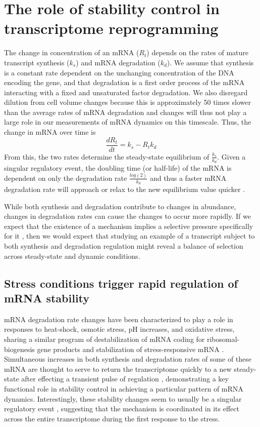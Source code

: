 \section{The role of stability control in transcriptome
reprogramming}

The change in concentration of an mRNA ($R_t$) depends
on the rates of mature transcript synthesis ($k_s$) and mRNA
degradation ($k_d$). We assume that
synthesis is a constant rate dependent on the unchanging concentration
of the DNA encoding the gene, and that degradation is a first
order process of the mRNA interacting with a fixed and unsaturated
factor degradation. We also disregard dilution from cell volume
changes because this is approximately 50 times slower than the average
rates of mRNA degradation and changes will thus not play a large role
in our measurements of mRNA dynamics on this timescale.  
Thus, the change in mRNA over time is $$
\frac{dR_t}{dt} = k_s - R_t k_d$$ From this, the two rates determine
the steady-state equilibrium of $\frac{k_s}{k_d}$. 
Given a singular regulatory event,
the doubling time (or half-life) of the mRNA is dependent on only the
degradation rate $\frac{log(2)}{k_d}$ and thus 
a faster mRNA degradation rate will approach or relax to
the new equilibrium value quicker \parencite{hargrove1989role}.

While both synthesis and
degradation contribute to changes in abundance, changes in degradation
rates can cause the changes to occur more rapidly. If we expect that
the existence of a mechanism implies a selective pressure specifically
for it 
\parencite{gould1979spandrels},
then we would expect that studying
an example of a transcript subject to both synthesis and degradation
regulation might reveal a balance of selection across steady-state and
dynamic conditions. 

\subsection{Stress conditions trigger rapid regulation of mRNA stability}

mRNA degradation rate changes have been characterized
to play a role in responses to heat-shock, osmotic stress, pH
increases, and oxidative stress, sharing a similar program of
destabilization of mRNA coding for ribosomal-biogenesis gene products
and stabilization of stress-responsive mRNA 
\parencite{canadell2015impact,molina2008comprehensive,shalem2011transcriptome,romero2009specific,molin2009mrna,castells2011heat,miller2011dynamic,garre2013nonsense}.
Simultaneous increases in both synthesis and
degradation rates of some of these mRNA are thought to serve to return
the transcriptome quickly to a new steady-state after effecting a
transient pulse of regulation 
\parencite{shalem2008transient,rabani2011metabolic},
demonstrating a key functional role in stability control in
achieving a particular pattern of mRNA dynamics. Interestingly, these
stability changes seem to usually be a singular regulatory event
\parencite{perez2013eukaryotic}, suggesting that the mechanism is
coordinated in its effect across the entire transcriptome during
the first response to the stress.

